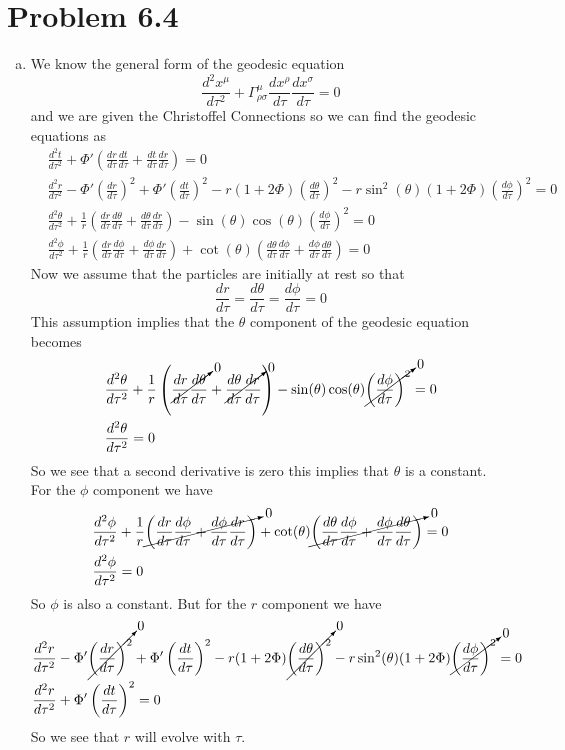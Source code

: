 \documentclass[11pt]{article}
\numberwithin{equation}{section}
\newcommand{\HWnum}{6}
\begin{document}
\section{Problem \HWnum.4}
\begin{enumerate}[(a)]
\item
We know the general form of the geodesic equation 
$$\frac{d^2x^{\mu}}{d\tau^2} + \Gamma^{\mu}_{\rho\sigma}\frac{dx^{\rho}}{d\tau}\frac{dx^{\sigma}}{d\tau} = 0$$
and we are given the Christoffel Connections so we can find the geodesic equations as
\begin{align*}
&\frac{d^2t}{d\tau^2} + \Phi'\left(\frac{dr}{d\tau}\frac{dt}{d\tau} + \frac{dt}{d\tau}\frac{dr}{d\tau}\right) = 0\\
&\frac{d^2r}{d\tau^2} - \Phi'\left(\frac{dr}{d\tau}\right)^2 + \Phi'\left(\frac{dt}{d\tau}\right)^2 -r(1+2\Phi)\left(\frac{d\theta}{d\tau}\right)^2  - r\sin^2(\theta)(1+2\Phi)\left(\frac{d\phi}{d\tau}\right)^2 = 0\\
&\frac{d^2\theta}{d\tau^2} + \frac{1}{r}\left(\frac{dr}{d\tau}\frac{d\theta}{d\tau} + \frac{d\theta}{d\tau}\frac{dr}{d\tau}\right) -\sin(\theta)\cos(\theta)\left(\frac{d\phi}{d\tau}\right)^2 = 0\\
&\frac{d^2\phi}{d\tau^2} + \frac{1}{r}\left(\frac{dr}{d\tau}\frac{d\phi}{d\tau}+ \frac{d\phi}{d\tau}\frac{dr}{d\tau}\right) + \cot(\theta)\left(\frac{d\theta}{d\tau}\frac{d\phi}{d\tau}+ \frac{d\phi}{d\tau}\frac{d\theta}{d\tau}\right) = 0
\end{align*}
Now we assume that the particles are initially at rest so that
$$\frac{dr}{d\tau} = \frac{d\theta}{d\tau} = \frac{d\phi}{d\tau} = 0$$
This assumption implies that the $\theta$ component of the geodesic equation becomes 
\begin{align*}
&\frac{d^2\theta}{d\tau^2} + \frac{1}{r}\left(\cancelto{0}{\frac{dr}{d\tau}\frac{d\theta}{d\tau}} + \cancelto{0}{\frac{d\theta}{d\tau}\frac{dr}{d\tau}}\right) -\sin(\theta)\cos(\theta)\cancelto{0}{\left(\frac{d\phi}{d\tau}\right)^2} = 0\\
&\frac{d^2\theta}{d\tau^2} = 0
\end{align*}
So we see that a second derivative is zero this implies that $\theta$ is a constant. For the $\phi$ component we have
\begin{align*}
&\frac{d^2\phi}{d\tau^2} + \frac{1}{r}\cancelto{0}{\left(\frac{dr}{d\tau}\frac{d\phi}{d\tau}+ \frac{d\phi}{d\tau}\frac{dr}{d\tau}\right)} + \cot(\theta)\cancelto{0}{\left(\frac{d\theta}{d\tau}\frac{d\phi}{d\tau}+ \frac{d\phi}{d\tau}\frac{d\theta}{d\tau}\right)} = 0\\
&\frac{d^2\phi}{d\tau^2} = 0
\end{align*}
So $\phi$ is also a constant. But for the $r$ component we have
\begin{align*}
&\frac{d^2r}{d\tau^2} - \Phi'\cancelto{0}{\left(\frac{dr}{d\tau}\right)^2} + \Phi'\left(\frac{dt}{d\tau}\right)^2 -r(1+2\Phi)\cancelto{0}{\left(\frac{d\theta}{d\tau}\right)^2}  - r\sin^2(\theta)(1+2\Phi)\cancelto{0}{\left(\frac{d\phi}{d\tau}\right)^2} = 0\\
&\frac{d^2r}{d\tau^2} + \Phi'\left(\frac{dt}{d\tau}\right)^2 = 0
\end{align*}
So we see that $r$ will evolve with $\tau$.


\end{enumerate}
\end{document}
